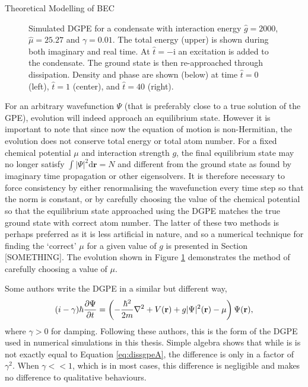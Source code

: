 \begin{chapter}{\label{cha:theoretical_model}Theoretical Modelling of BEC}
\begin{figure}
	\caption{Simulated DGPE for a condensate with interaction energy $\hat{g}=2000$, $\hat{\mu}=25.27$ and $\gamma=0.01$. The total energy (upper) is shown during both imaginary and real time. At $\hat{t} = -\mathrm{i}$ an excitation is added to the condensate. The ground state is then re-approached through dissipation. Density and phase are shown (below) at time $\hat{t}=0$ (left), $\hat{t}=1$ (center), and $\hat{t}=40$ (right).}\label{fig_excitationdecay}
\end{figure}

	For an arbitrary wavefunction $\Psi$ (that is preferably close to a true solution of the GPE), evolution will indeed approach an equilibrium state. However it is important to note that since now the equation of motion is non-Hermitian, the evolution does not conserve total energy or total atom number. For a fixed chemical potential $\mu$ and interaction strength $g$, the final equilibrium state may no longer satisfy $\int |\Psi|^2 \mathrm{d}\mathbf{r} = N$ and different from the ground state as found by imaginary time propagation or other eigensolvers. It is therefore necessary to force consistency by either renormalising the wavefunction every time step so that the norm is constant, or by carefully choosing the value of the chemical potential so that the equilibrium state approached using the DGPE matches the true ground state with correct atom number. The latter of these two methods is perhaps preferred as it is less artificial in nature, and so a numerical technique for finding the `correct' $\mu$ for a given value of $g$ is presented in Section [SOMETHING]. The evolution shown in Figure \ref{fig_excitationdecay} demonstrates the method of carefully choosing a value of $\mu$.

	Some authors \cite{tsubota_kasamatsu_02,madarassy_barenghi_08} write the DGPE in a similar but different way,
	\begin{equation}\label{eq:dissgpeB}
		(i-\gamma)\hbar \frac{\partial \Psi}{\partial t} = \left( -\frac{\hbar^2 }{2m}\nabla^2 + V({\bf r}) + g|\Psi|^2({\bf r}) - \mu \right) \Psi({\bf r}),
	\end{equation}
	where $\gamma > 0$ for damping. Following these authors, this is the form of the DGPE used in numerical simulations in this thesis. Simple algebra shows that while is is not exactly equal to Equation \ref{eq:dissgpeA}, the difference is only in a factor of $\gamma^2$. When $\gamma<<1$, which is in most cases, this difference is negligible and makes no difference to qualitative behaviours.


\end{chapter}
